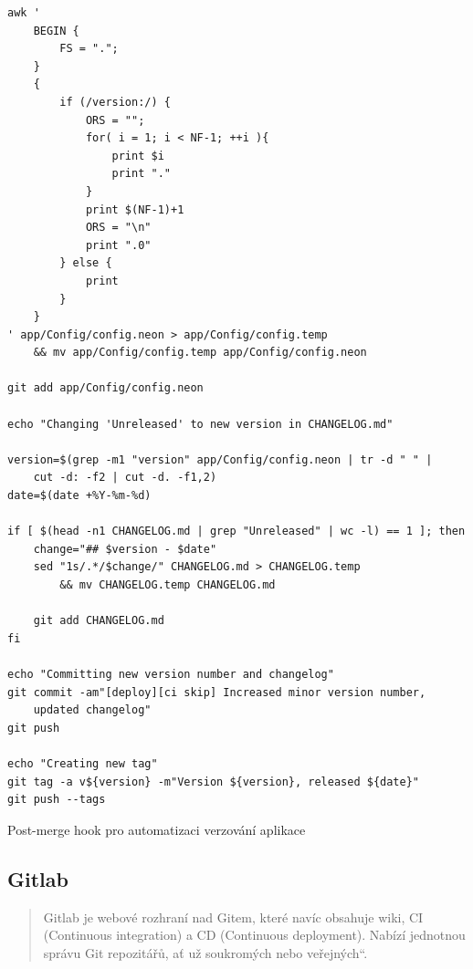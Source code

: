 \begin{listing}[H]
	\begin{verbatim}
awk '
    BEGIN { 
        FS = ".";
    }
    {
        if (/version:/) {
            ORS = "";
            for( i = 1; i < NF-1; ++i ){
                print $i
                print "."
            }
            print $(NF-1)+1
            ORS = "\n"
            print ".0"
        } else {
            print
        }
    }
' app/Config/config.neon > app/Config/config.temp
    && mv app/Config/config.temp app/Config/config.neon

git add app/Config/config.neon

echo "Changing 'Unreleased' to new version in CHANGELOG.md"

version=$(grep -m1 "version" app/Config/config.neon | tr -d " " |
    cut -d: -f2 | cut -d. -f1,2)
date=$(date +%Y-%m-%d)

if [ $(head -n1 CHANGELOG.md | grep "Unreleased" | wc -l) == 1 ]; then
    change="## $version - $date"
    sed "1s/.*/$change/" CHANGELOG.md > CHANGELOG.temp
        && mv CHANGELOG.temp CHANGELOG.md

    git add CHANGELOG.md
fi

echo "Committing new version number and changelog"
git commit -am"[deploy][ci skip] Increased minor version number,
    updated changelog"
git push

echo "Creating new tag"
git tag -a v${version} -m"Version ${version}, released ${date}"
git push --tags
	\end{verbatim}
	\caption{Post-merge hook pro automatizaci verzování aplikace} \label{code:hook}
\end{listing}

\subsection{Gitlab} \label{version:gitlab}

\begin{quote}
\quotedblbase Gitlab je webové rozhraní nad Gitem, které navíc obsahuje wiki, CI (Continuous integration) a CD (Continuous deployment). Nabízí jednotnou správu Git repozitářů, ať už soukromých nebo veřejných\textquotedblleft \cite{gitlab}.
\end{quote}


